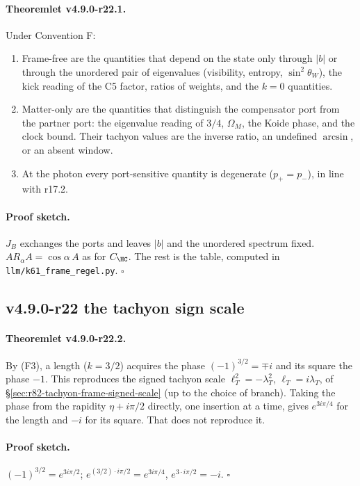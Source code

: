 \paragraph{Theoremlet v4.9.0-r22.1.}
Under Convention F:
\begin{enumerate}[leftmargin=2em]
\item[(a)] Frame-free are the quantities that depend on the state only through \(|b|\) or through the unordered pair of
eigenvalues (visibility, entropy, \(\sin^2\theta_W\)), the kick reading of the C5 factor, ratios of weights, and the \(k=0\)
quantities.
\item[(b)] Matter-only are the quantities that distinguish the compensator port from the partner port: the eigenvalue reading
of \(3/4\), \(\Omega_M\), the Koide phase, and the clock bound.  Their tachyon values are the inverse ratio, an undefined
\(\arcsin\), or an absent window.
\item[(c)] At the photon every port-sensitive quantity is degenerate (\(p_+=p_-\)), in line with r17.2.
\end{enumerate}

\paragraph{Proof sketch.}
\(J_B\) exchanges the ports and leaves \(|b|\) and the unordered spectrum fixed.  \(A R_\alpha A=\cos\alpha\,A\) as for \(C_{\HC}\).
The rest is the table, computed in \texttt{llm/k61\_frame\_regel.py}.  \(\square\)

\subsection*{v4.9.0-r22 the tachyon sign scale}
\label{subsec:v490-r22-sign-scale}

\paragraph{Theoremlet v4.9.0-r22.2.}
By (F3), a length (\(k=3/2\)) acquires the phase \((-1)^{3/2}=\mp i\) and its square the phase \(-1\).  This reproduces the signed
tachyon scale \(\ell_T^2=-\lambda_T^2\), \(\ell_T=i\lambda_T\), of \S\ref{sec:r82-tachyon-frame-signed-scale} (up to the choice of
branch).  Taking the phase from the rapidity \(\eta+i\pi/2\) directly, one insertion at a time, gives \(e^{3i\pi/4}\) for the length
and \(-i\) for its square.  That does not reproduce it.

\paragraph{Proof sketch.}
\((-1)^{3/2}=e^{3i\pi/2}\); \(e^{(3/2)\cdot i\pi/2}=e^{3i\pi/4}\), \(e^{3\cdot i\pi/2}=-i\).  \(\square\)

